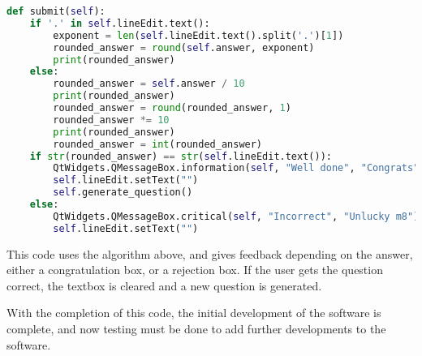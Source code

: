 \begin{lstlisting}[language=Python,caption=Answer verification]
def submit(self):
	if '.' in self.lineEdit.text():
		exponent = len(self.lineEdit.text().split('.')[1])
		rounded_answer = round(self.answer, exponent)
		print(rounded_answer)
	else:
		rounded_answer = self.answer / 10
		print(rounded_answer)
		rounded_answer = round(rounded_answer, 1)
		rounded_answer *= 10
		print(rounded_answer)
		rounded_answer = int(rounded_answer)
	if str(rounded_answer) == str(self.lineEdit.text()):
		QtWidgets.QMessageBox.information(self, "Well done", "Congrats")
		self.lineEdit.setText("")
		self.generate_question()
	else:
		QtWidgets.QMessageBox.critical(self, "Incorrect", "Unlucky m8")
		self.lineEdit.setText("")
\end{lstlisting}
This code uses the algorithm above, and gives feedback depending on the answer, either a congratulation box, or a rejection box. If the user gets the question correct, the textbox is cleared and a new question is generated. 

With the completion of this code, the initial development of the software is complete, and now testing must be done to add further developments to the software.
